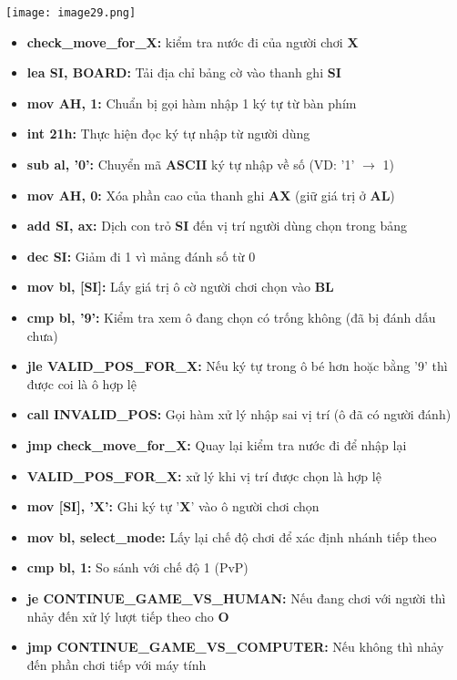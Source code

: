 \begin{itemize}
    \texttt{[image: image29.png]}
    \begin{itemize}
        \item \textbf{check\_move\_for\_X:}  kiểm tra nước đi của người chơi \textbf{X}
        \item \textbf{lea SI, BOARD:} Tải địa chỉ bảng cờ vào thanh ghi \textbf{SI}
        \item \textbf{mov AH, 1:} Chuẩn bị gọi hàm nhập 1 ký tự từ bàn phím
        \item \textbf{int 21h: }Thực hiện đọc ký tự nhập từ người dùng
        \item \textbf{sub al, '0': }Chuyển mã \textbf{ASCII} ký tự nhập về số (VD: '1' $\rightarrow$ 1)
        \item \textbf{mov AH, 0:} Xóa phần cao của thanh ghi \textbf{AX }(giữ giá trị ở \textbf{AL})
        \item \textbf{add SI, ax:} Dịch con trỏ \textbf{SI} đến vị trí người dùng chọn trong bảng
        \item \textbf{dec SI:} Giảm đi 1 vì mảng đánh số từ 0
        \item \textbf{mov bl, [SI]:} Lấy giá trị ô cờ người chơi chọn vào \textbf{BL}
        \item \textbf{cmp bl, '9':} Kiểm tra xem ô đang chọn có trống không (đã bị đánh dấu chưa)
        \item \textbf{jle VALID\_POS\_FOR\_X:} Nếu ký tự trong ô bé hơn hoặc bằng '9' thì được coi là ô hợp lệ
        \item \textbf{call INVALID\_POS:} Gọi hàm xử lý nhập sai vị trí (ô đã có người đánh)
        \item \textbf{jmp check\_move\_for\_X:}  Quay lại kiểm tra nước đi để nhập lại
        \item \textbf{VALID\_POS\_FOR\_X: } xử lý khi vị trí được chọn là hợp lệ
        \item \textbf{mov [SI], 'X':} Ghi ký tự '\textbf{X}' vào ô người chơi chọn
        \item \textbf{mov bl, select\_mode: }Lấy lại chế độ chơi để xác định nhánh tiếp theo
        \item \textbf{cmp bl, 1:} So sánh với chế độ 1 (PvP)
        \item \textbf{je CONTINUE\_GAME\_VS\_HUMAN:} Nếu đang chơi với người thì nhảy đến xử lý lượt tiếp theo cho \textbf{O}
        \item \textbf{jmp CONTINUE\_GAME\_VS\_COMPUTER:} Nếu không thì nhảy đến phần chơi tiếp với máy tính       
    \end{itemize} 
\end{itemize}

